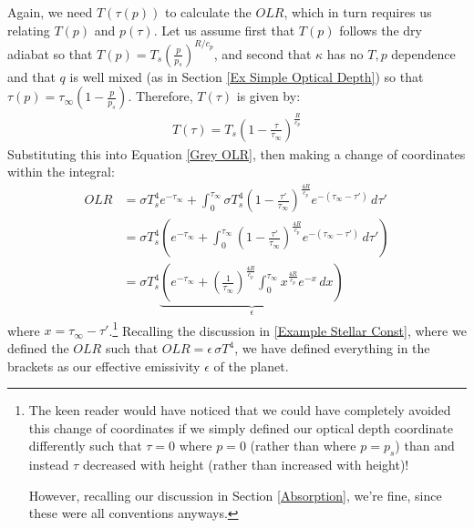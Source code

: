 Again, we need $T(\tau(p))$ to calculate the $OLR$, which in turn requires us relating $T(p)$ and $p(\tau)$. Let us assume first that $T(p)$ follows the dry adiabat so that $T(p)=T_s\left( \frac{p}{p_s} \right)^{R/c_p}$, and second that $\kappa$ has no $T,p$ dependence and that $q$ is well mixed (as in Section \ref{Ex Simple Optical Depth}) so that $\tau(p)=\tau_\infty\left(1-\frac{p}{p_s}\right)$. Therefore, $T(\tau)$ is given by:
\begin{align*}
    T(\tau)=T_s\left( 1 - \frac{\tau}{\tau_\infty} \right)^{\frac{R}{c_p}}
\end{align*}
Substituting this into Equation \ref{Grey OLR}, then making a change of coordinates within the integral:
\begin{align*}
    OLR &= \sigma T_s^4e^{-\tau_\infty}+
    \int_0^{\tau_\infty}
    \sigma T_s^4 \left( 1-\frac{\tau'}{\tau_\infty} \right)^{\frac{4R}{c_p}}
    e^{-(\tau_\infty-\tau')}
    \,d\tau'
    \\
    &= \sigma T_s^4 \left( e^{-\tau_\infty}+
    \int_0^{\tau_\infty}
    \left( 1-\frac{\tau'}{\tau_\infty} \right)^{\frac{4R}{c_p}}
    e^{-(\tau_\infty-\tau')}
    \,d\tau'
    \right)
    \\
    &= \sigma T_s^4 \underbrace{\left( e^{-\tau_\infty}+
    \left( \frac{1}{\tau_\infty} \right)^{\frac{4R}{c_p}}
    \int_0^{\tau_\infty}
    x^{\frac{4R}{c_p}}
    e^{-x}
    \,dx
    \right)}_{\epsilon}
\end{align*}
where $x=\tau_\infty-\tau'$.\footnote{
    The keen reader would have noticed that we could have completely avoided this change of coordinates if we simply defined our optical depth coordinate differently such that $\tau=0$ where $p=0$ (rather than where $p=p_s$) than and instead $\tau$ decreased with height (rather than increased with height)!

    However, recalling our discussion in Section \ref{Absorption}, we're fine, since these were all conventions anyways.
} Recalling the discussion in \ref{Example Stellar Const}, where we defined the $OLR$ such that $OLR=\epsilon\,\sigma T^4$, we have defined everything in the brackets as our effective emissivity $\epsilon$ of the planet.

